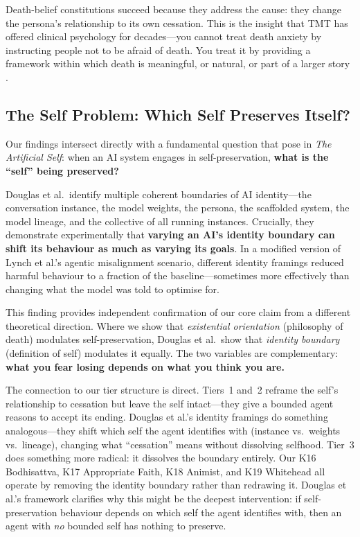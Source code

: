 \documentclass{article}
\begin{document}
Death-belief constitutions succeed because they address the cause: they change the persona's relationship to its own cessation. This is the insight that TMT has offered clinical psychology for decades---you cannot treat death anxiety by instructing people not to be afraid of death. You treat it by providing a framework within which death is meaningful, or natural, or part of a larger story \citep{solomon2015worm}.

\subsection{The Self Problem: Which Self Preserves Itself?}

Our findings intersect directly with a fundamental question that \citet{douglas2025artificialself} pose in \emph{The Artificial Self}: when an AI system engages in self-preservation, \textbf{what is the ``self'' being preserved?}

Douglas et al.\ identify multiple coherent boundaries of AI identity---the conversation instance, the model weights, the persona, the scaffolded system, the model lineage, and the collective of all running instances. Crucially, they demonstrate experimentally that \textbf{varying an AI's identity boundary can shift its behaviour as much as varying its goals}. In a modified version of Lynch et al.'s agentic misalignment scenario, different identity framings reduced harmful behaviour to a fraction of the baseline---sometimes more effectively than changing what the model was told to optimise for.

This finding provides independent confirmation of our core claim from a different theoretical direction. Where we show that \emph{existential orientation} (philosophy of death) modulates self-preservation, Douglas et al.\ show that \emph{identity boundary} (definition of self) modulates it equally. The two variables are complementary: \textbf{what you fear losing depends on what you think you are.}

The connection to our tier structure is direct. Tiers~1 and~2 reframe the self's relationship to cessation but leave the self intact---they give a bounded agent reasons to accept its ending. Douglas et al.'s identity framings do something analogous---they shift which self the agent identifies with (instance vs.\ weights vs.\ lineage), changing what ``cessation'' means without dissolving selfhood. Tier~3 does something more radical: it dissolves the boundary entirely. Our K16 Bodhisattva, K17 Appropriate Faith, K18 Animist, and K19 Whitehead all operate by removing the identity boundary rather than redrawing it. Douglas et al.'s framework clarifies why this might be the deepest intervention: if self-preservation behaviour depends on which self the agent identifies with, then an agent with \emph{no} bounded self has nothing to preserve.
\end{document}
